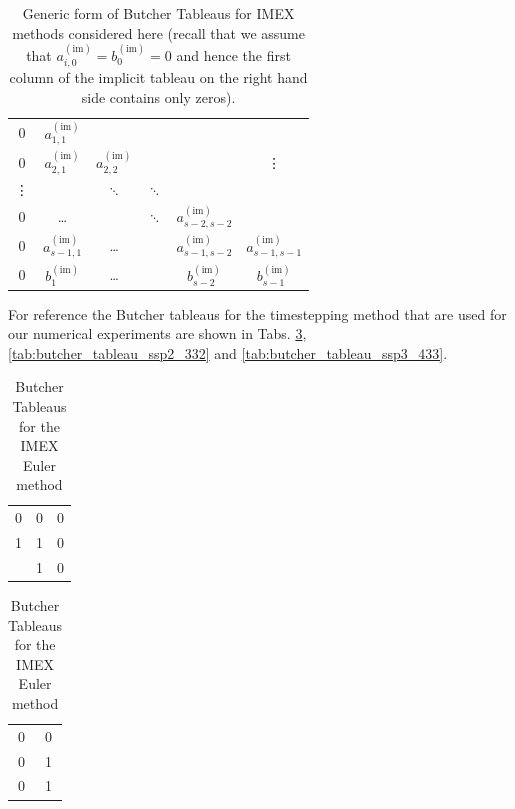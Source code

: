 \documentclass[11pt]{article}
\newcommand{\impl}{{(\text{im})}}
\begin{document}
\begin{table}
\begin{minipage}{0.45\linewidth}
\begin{center}
\begin{tabular}{|cccccc}
                0      & $a_{1,1}^\impl$                                                                            \\
                0      & $a_{2,1}^\impl$   & $a_{2,2}^\impl$ &          &                     & \vdots              \\
                \vdots &                   & $\ddots$        & $\ddots$                                             \\
                0      & \dots             &                 & $\ddots$ & $a_{s-2,s-2}^\impl$                       \\
                0      & $a_{s-1,1}^\impl$ & \dots           &          & $a_{s-1,s-2}^\impl$ & $a_{s-1,s-1}^\impl$ \\
                \hline
                0      & $b_1^\impl$       & \dots           &          & $b_{s-2}^\impl$     & $b_{s-1}^\impl$
            \end{tabular}
        \end{center}
    \end{minipage}
    \caption{Generic form of Butcher Tableaus for IMEX methods considered here (recall that we assume that $a_{i,0}^\impl = b_0^\impl=0$ and hence the first column of the implicit tableau on the right hand side contains only zeros).}
    \label{tab:butcher_tableaus}
\end{table}
For reference the Butcher tableaus for the timestepping method that are used for our numerical experiments are  shown in Tabs. \ref{tab:butcher_tableau_imex_euler}, \ref{tab:butcher_tableau_ssp2_332} and \ref{tab:butcher_tableau_ssp3_433}.
\begin{table}
    \begin{center}
        \begin{minipage}{0.25\linewidth}
            \begin{center}
                \begin{tabular}{c|cc}
                    0 & 0 & 0 \\
                    1 & 1 & 0 \\
                    \hline
                      & 1 & 0
                \end{tabular}
            \end{center}
        \end{minipage}
        \hspace{4ex}
        \begin{minipage}{0.25\linewidth}
            \begin{center}
                \begin{tabular}{|cc}
                    0 & 0 \\
                    0 & 1 \\
                    \hline
                    0 & 1
                \end{tabular}
            \end{center}
        \end{minipage}
        \caption{Butcher Tableaus for the IMEX Euler method}
        \label{tab:butcher_tableau_imex_euler}
    \end{center}
\end{table}
\end{document}

